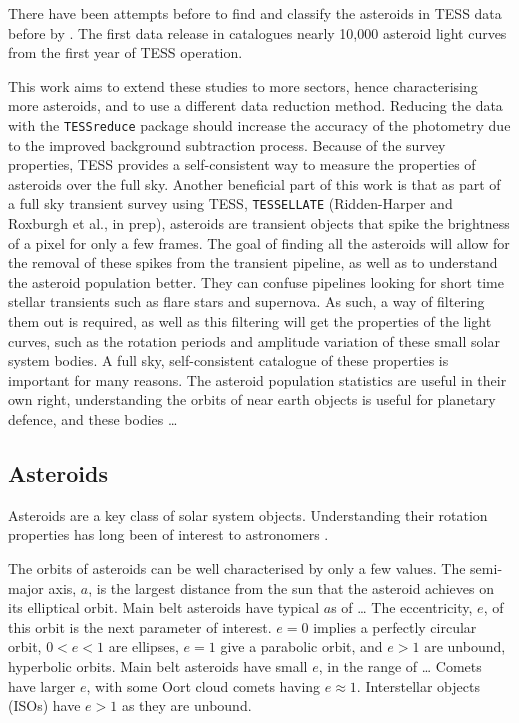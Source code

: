 \documentclass[12pt]{article}
\begin{document}
There have been attempts before to find and classify the asteroids in TESS data before by \citet{Pal2018, Pal2020}. 
The first data release in \citet{Pal2020} catalogues nearly 10,000 asteroid light curves from the first year of TESS operation.

This work aims to extend these studies to more sectors, hence characterising more asteroids, and to use a different data reduction method.
Reducing the data with the \texttt{TESSreduce} package \citep{Ridden-Harper2021} should increase the accuracy of the photometry due to the improved background subtraction process.
Because of the survey properties, TESS provides a self-consistent way to measure the properties of asteroids over the full sky.   
Another beneficial part of this work is that as part of a full sky transient survey using TESS, \texttt{TESSELLATE} (Ridden-Harper and Roxburgh et al., in prep), asteroids are transient objects that spike the brightness of a pixel for only a few frames.
The goal of finding all the asteroids will allow for the removal of these spikes from the transient pipeline, as well as to understand the asteroid population better.  
They can confuse pipelines looking for short time stellar transients such as flare stars and supernova. 
As such, a way of filtering them out is required, as well as this filtering will get the properties of the light curves, such as the rotation periods and amplitude variation of these small solar system bodies.
A full sky, self-consistent catalogue of these properties is important for many reasons. 
The asteroid population statistics are useful in their own right, understanding the orbits of near earth objects is useful for planetary defence, and these bodies \dots      


 



\subsection{Asteroids}\label{SubSec:Asteroid}

Asteroids are a key class of solar system objects. 
Understanding their rotation properties has long been of interest to astronomers \citep[e.g.][]{Weidenschilling1981,Harris1994}. 

The orbits of asteroids can be well characterised by only a few values. The semi-major axis, $a$, is the largest distance from the sun that the asteroid achieves on its elliptical orbit.
Main belt asteroids have typical $a$s of \dots %
The eccentricity, $e$, of this orbit is the next parameter of interest. $e=0$ implies a perfectly circular orbit, $0<e<1$ are ellipses, $e=1$ give a parabolic orbit, and $e>1$ are unbound, hyperbolic orbits. 
Main belt asteroids have small $e$, in the range of \dots
Comets have larger $e$, with some Oort cloud comets having $e\approx 1$. 
Interstellar objects (ISOs) have $e>1$ as they are unbound.  
\end{document}
